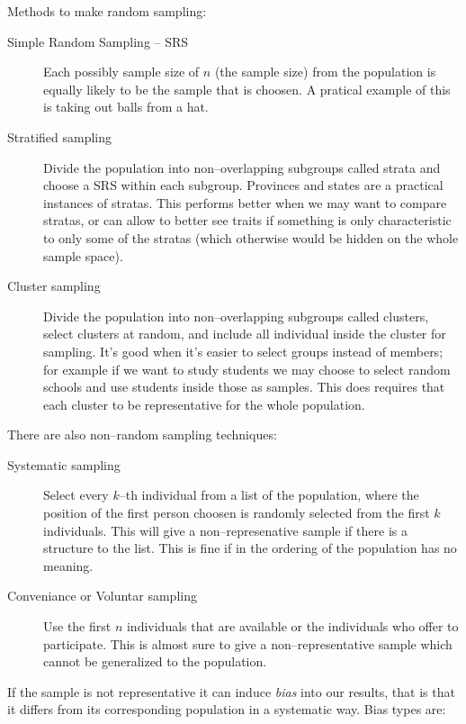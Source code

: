 Methods to make random sampling:

\begin{description}
	\item[Simple Random Sampling -- SRS] Each possibly sample size of $n$ (the
	      sample size) from the population is equally likely to be the sample that is
	      choosen. A pratical example of this is taking out balls from a hat.
	\item[Stratified sampling] Divide the population into non--overlapping
	      subgroups called strata and choose a SRS within each subgroup. Provinces and
	      states are a practical instances of stratas. This performs better when we may
	      want to compare stratas, or can allow to better see traits if something is
	      only characteristic to only some of the stratas (which otherwise would be
	      hidden on the whole sample space).
	\item[Cluster sampling] Divide the population into non--overlapping subgroups
	      called clusters, select clusters at random, and include all individual inside
	      the cluster for sampling. It's good when it's easier to select groups instead
	      of members; for example if we want to study students we may choose to select
	      random schools and use students inside those as samples. This does requires
	      that each cluster to be representative for the whole population.
\end{description}

There are also non--random sampling techniques:

\begin{description}
	\item[Systematic sampling] Select every $k$--th individual from a list of the
	      population, where the position of the first person choosen is randomly
	      selected from the first $k$ individuals. This will give a non--represenative
	      sample if there is a structure to the list. This is fine if in the ordering of
	      the population has no meaning.
	\item[Conveniance or Voluntar sampling] Use the first $n$ individuals that are
	      available or the individuals who offer to participate. This is almost sure to
	      give a non--representative sample which cannot be generalized to the
	      population.
\end{description}

If the sample is not representative it can induce \emph{bias} into our results,
that is that it differs from its corresponding population in a systematic way.
Bias types are:

